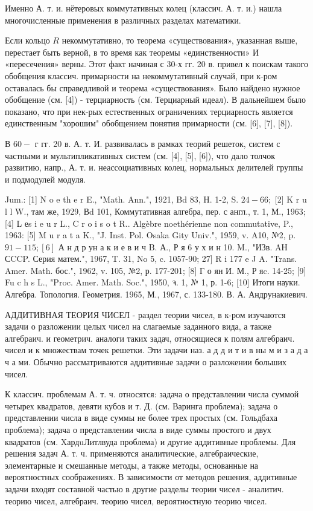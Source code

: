 \documentclass[10pt]{article}
\begin{document}
Именно А. т. и. нётеровых коммутативных колец (классич. А. т. и.) нашла многочисленные применения в различных разделах математики.



Если кольцо $R$ некоммутативно, то теорема «существования», указанная выше, перестает быть верной, в то время как теоремы «единственности» И «пересечения» верны. Этот факт начиная с 30-х гг. 20 в. привел к поискам такого обобщения классич. примарности на некоммутативный случай, при к-ром оставалась бы справедливой и теорема «существования». Было найдено нужное обобщение (см. [4]) - терциарность (см. Терциарный идеал). В дальнейшем было показано, что при нек-рых естественных ограничениях терциарность является единственным "хорошим" обобщением понятия примарности (см. [6], [7], [8]).



В $60-$ г гг. 20 в. А. т. И. развивалась в рамках теорий решеток, систем с частными и мультипликативных систем (см. [4], [5], [6]), что дало толчок развитию, напр., А. т. и. неассоциативных колец, нормальных делителей группы и подмодулей модуля.



Jum.: [1] N o e th e r E., "Math. Ann.", 1921, Bd 83, H. 1-2, S. $24-66 ;$ [2] K r u l l W., там же, 1929, Вd 101, Коммутативная алгебра, пер. с англ., т. 1, М., 1963; [4] L еs i e u r L., C r o i s o t R.. Algèbre noethérienne non commutative, P., 1963: [5] M u r a t a K., "J. Inst. Pol. Osaka Gity Univ.", 1959, v. A10, №2, p. $91-115 ;[6]$ А н д р ун а к и е в и ч B. А., Р я 6 у х и н 10. M., "ИЗв. AН СCCP. Серия матем.", 1967, T. 31, No 5, c. 1057-90; 27] R i 177 e J A. "Trans. Amer. Math. бос.", 1962, v. 105, №2, р. 177-201; [8] Г о ян И. М., Р яc. 14-25; [9] Fu c h s L., "Proc. Amer. Math. Soc.", 1950, จ. 1, № 1, р. 1-6; [10] Итоги науки. Алгебра. Топология. Геометрия. 1965, М., 1967, с. 133-180. В. А. Андрунакиевич.



АДДИТИВНАЯ ТЕОРИЯ ЧИСЕЛ - раздел теории чисел, в к-ром изучаются задачи о разложении целых чисел на слагаемые заданного вида, а также алгебраич. и геометрич. аналоги таких задач, относящиеся к полям алгебраич. чисел и к множествам точек решетки. Эти задачи наз. а д д и т и в ны м и з а д а ч а ми. Обычно рассматриваются аддитивные задачи о разложении больших чисел.



К классич. проблемам А. т. ч. относятся: задача о представлении числа суммой четырех квадратов, девяти кубов и т. Д. (см. Варинга проблема); задача о представлении числа в виде суммы не более трех простых (см. Гольдбаха проблема); задача о представлении числа в виде суммы простого и двух квадратов (см. XардuЛитлвуда проблема) и другие аддитивные проблемы. Для решения задач А. т. ч. применяются аналитические, алгебраические, элементарные и смешанные методы, а также методы, основанные на вероятностных соображениях. В зависимости от методов решения, аддитивные задачи входят составной частью в другие разделы теории чисел - аналитич. теорию чисел, алгебраич. теорию чисел, вероятностную теорию чисел.
\end{document}
